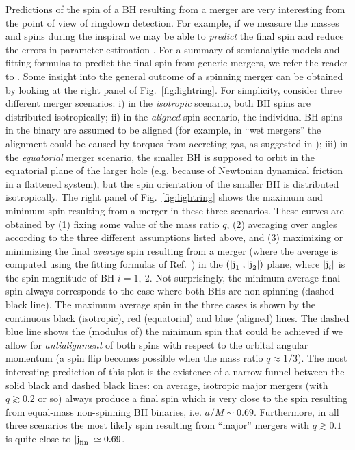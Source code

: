 \documentclass[]{iopart}
\newcommand{\hj}[1]{\vert \mbox{\boldmath{j}}_{#1}        \vert}
\newcommand{\hjf}  {\vert \mbox{\boldmath{j}}_{\rm fin}   \vert}
\begin{document}
Predictions of the spin of a BH resulting from a merger are very interesting
from the point of view of ringdown detection. For example, if we measure the
masses and spins during the inspiral we may be able to {\em predict} the final
spin and reduce the errors in parameter estimation
\cite{Luna:2006gw,Ajith:2009fz}. For a summary of semianalytic models and
fitting formulas to predict the final spin from generic mergers, we refer the
reader to
\cite{Buonanno:2007sv,Rezzolla:2007rz,Rezzolla:2008sd,Barausse:2009uz}. Some
insight into the general outcome of a spinning merger can be obtained by
looking at the right panel of Fig.~\ref{fig:lightring}. For simplicity,
consider three different merger scenarios: i) in the {\em isotropic} scenario,
both BH spins are distributed isotropically; ii) in the {\em aligned} spin
scenario, the individual BH spins in the binary are assumed to be aligned (for
example, in ``wet mergers'' the alignment could be caused by torques from
accreting gas, as suggested in \cite{Bogdanovic:2007hp}); iii) in the {\em
  equatorial} merger scenario, the smaller BH is supposed to orbit in the
equatorial plane of the larger hole (e.g. because of Newtonian dynamical
friction in a flattened system), but the spin orientation of the smaller BH is
distributed isotropically. The right panel of Fig.~\ref{fig:lightring} shows
the maximum and minimum spin resulting from a merger in these three
scenarios. These curves are obtained by (1) fixing some value of the mass
ratio $q$, (2) averaging over angles according to the three different
assumptions listed above, and (3) maximizing or minimizing the final {\em
  average} spin resulting from a merger (where the average is computed using
the fitting formulas of Ref.~\cite{Rezzolla:2007rz}) in the $(\hj{1},\hj{2})$
plane, where $\hj{i}$ is the spin magnitude of BH $i=1,~2$. Not surprisingly,
the minimum average final spin always corresponds to the case where both BHs
are non-spinning (dashed black line). The maximum average spin in the three
cases is shown by the continuous black (isotropic), red (equatorial) and blue
(aligned) lines. The dashed blue line shows the (modulus of) the minimum spin
that could be achieved if we allow for {\it antialignment} of both spins with
respect to the orbital angular momentum (a spin flip becomes possible when the
mass ratio $q\approx 1/3$). The most interesting prediction of this plot is
the existence of a narrow funnel between the solid black and dashed black
lines: on average, isotropic major mergers (with $q\gtrsim 0.2$ or so) always
produce a final spin which is very close to the spin resulting from equal-mass
non-spinning BH binaries, i.e. $a/M\sim 0.69$. Furthermore, in all three
scenarios the most likely spin resulting from ``major'' mergers with $q\gtrsim
0.1$ is quite close to $\hjf \simeq 0.69$.
\end{document}
